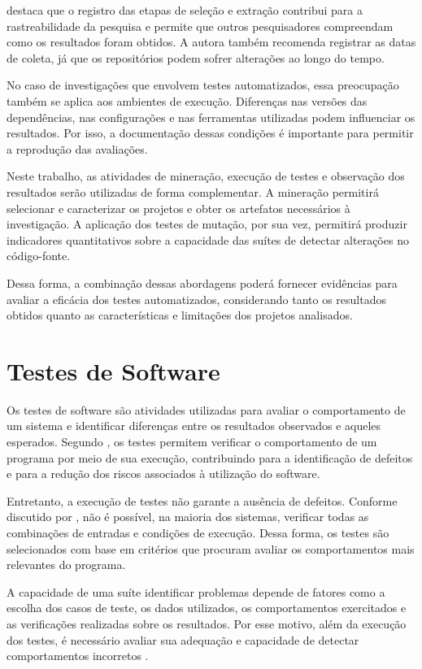  destaca que o registro das etapas de seleção e extração contribui para a rastreabilidade da pesquisa e permite que outros pesquisadores compreendam como os resultados foram obtidos. A autora também recomenda registrar as datas de coleta, já que os repositórios podem sofrer alterações ao longo do tempo.

No caso de investigações que envolvem testes automatizados, essa preocupação também se aplica aos ambientes de execução. Diferenças nas versões das dependências, nas configurações e nas ferramentas utilizadas podem influenciar os resultados. Por isso, a documentação dessas condições é importante para permitir a reprodução das avaliações.

Neste trabalho, as atividades de mineração, execução de testes e observação dos resultados serão utilizadas de forma complementar. A mineração permitirá selecionar e caracterizar os projetos e obter os artefatos necessários à investigação. A aplicação dos testes de mutação, por sua vez, permitirá produzir indicadores quantitativos sobre a capacidade das suítes de detectar alterações no código-fonte.

Dessa forma, a combinação dessas abordagens poderá fornecer evidências para avaliar a eficácia dos testes automatizados, considerando tanto os resultados obtidos quanto as características e limitações dos projetos analisados.

\section{Testes de Software}

Os testes de software são atividades utilizadas para avaliar o comportamento de um sistema e identificar diferenças entre os resultados observados e aqueles esperados. Segundo , os testes permitem verificar o comportamento de um programa por meio de sua execução, contribuindo para a identificação de defeitos e para a redução dos riscos associados à utilização do software.

Entretanto, a execução de testes não garante a ausência de defeitos. Conforme discutido por , não é possível, na maioria dos sistemas, verificar todas as combinações de entradas e condições de execução. Dessa forma, os testes são selecionados com base em critérios que procuram avaliar os comportamentos mais relevantes do programa.

A capacidade de uma suíte identificar problemas depende de fatores como a escolha dos casos de teste, os dados utilizados, os comportamentos exercitados e as verificações realizadas sobre os resultados. Por esse motivo, além da execução dos testes, é necessário avaliar sua adequação e capacidade de detectar comportamentos incorretos \cite{ammann2016}.

